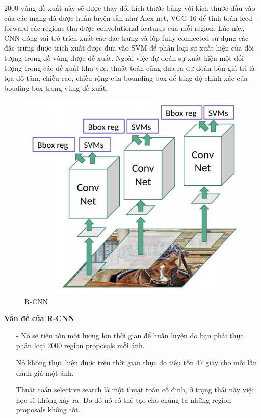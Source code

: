 2000 vùng đề xuất này sẽ được thay đổi kích thước bằng với kích thước đầu vào của các mạng đã được huấn luyện sẵn như Alex-net, VGG-16 để tính toán feed-forward các regions thu được convolutional features của mỗi region. Lúc này, CNN đóng vai trò trích xuất các đặc trưng và lớp fully-connected sử dụng các đặc trưng được trích xuất được đưa vào SVM để phân loại sự xuất hiện của đối tượng trong đề vùng được đề xuất. Ngoài việc dự đoán sự xuất hiện một đối tượng trong các đề xuất khu vực, thuật toán cũng đưa ra dự đoán bốn giá trị là tọa đô tâm, chiều cao, chiều rộng của bounding box để tăng độ chính xác của bouding box trong vùng đề xuất.\par
\begin{figure}[H]
\begin{center}
\includegraphics[scale=0.5]{chap4/image/rcnn2.png}
\caption{R-CNN}
\end{center}
\end{figure}
\textbf{Vấn đề của R-CNN}
\begin{itemize}
\item[-]Nó sẽ tiêu tốn một lượng lớn thời gian để huấn luyện do bạn phải thực phân loại 2000  region proposals mỗi ảnh.
\item[]Nó không thực hiện được trên thời gian thực do tiêu tốn 47 giây cho mỗi lần đánh giá một ảnh.
\item[]Thuật toán selective search \cite{van2011segmentation} là một thuật toán cố định, ở trạng thái này việc học sẽ không xảy ra. Do đó nó có thể tạo cho chúng ta những region proposals không tốt.
\end{itemize}
